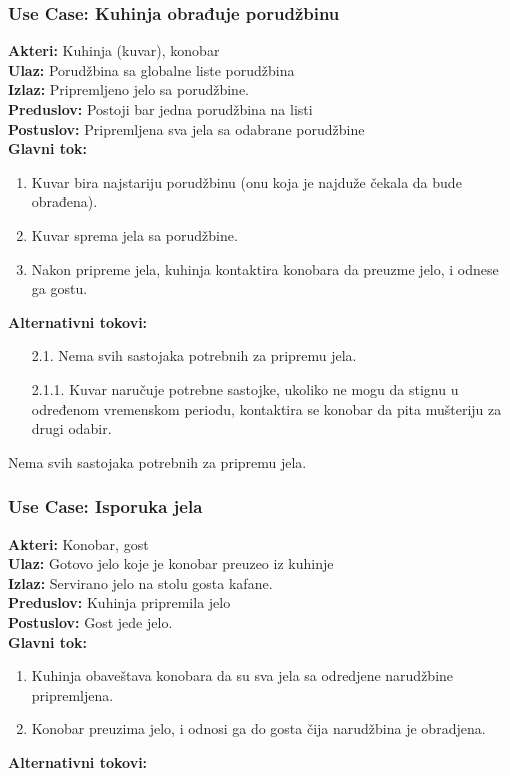 \documentclass{article}
\begin{document}
\subsubsection{\textbf{Use Case:} Kuhinja obrađuje porudžbinu}
\textbf{Akteri:} Kuhinja (kuvar), konobar\\
\textbf{Ulaz:} Porudžbina sa globalne liste porudžbina\\
\textbf{Izlaz:} Pripremljeno jelo sa porudžbine.\\
\textbf{Preduslov:} Postoji bar jedna porudžbina na listi\\
\textbf{Postuslov:} Pripremljena sva jela sa odabrane porudžbine\\
\textbf{Glavni tok:}
\begin{enumerate}
\item Kuvar bira najstariju porudžbinu (onu koja je najduže čekala da bude obrađena).
\item Kuvar sprema jela sa porudžbine.
\item Nakon pripreme jela, kuhinja kontaktira konobara da preuzme jelo, i odnese ga gostu.
\end{enumerate}
\textbf{Alternativni tokovi:}
\begin{enumerate}
\item [2.1.] Nema svih sastojaka potrebnih za pripremu jela.
\item [2.1.1.] Kuvar naručuje potrebne sastojke, ukoliko ne mogu da stignu u određenom vremenskom periodu, kontaktira se konobar da pita mušteriju za drugi odabir. 
\end{enumerate} Nema svih sastojaka potrebnih za pripremu jela.\\

 
 
\subsubsection{\textbf{Use Case:} Isporuka jela}
\textbf{Akteri:} Konobar, gost\\
 \textbf{Ulaz:} Gotovo jelo koje je konobar preuzeo iz kuhinje\\
 \textbf{Izlaz:} Servirano jelo na stolu gosta kafane.\\
 \textbf{Preduslov:} Kuhinja pripremila jelo\\
 \textbf{Postuslov:} Gost jede jelo.\\
 \textbf{Glavni tok:} 
\begin{enumerate}
\item Kuhinja obaveštava konobara da su sva jela sa odredjene narudžbine pripremljena.
\item Konobar preuzima jelo, i odnosi ga do gosta čija narudžbina je obradjena. 
\end{enumerate}
\textbf{Alternativni tokovi:} \\
\end{document}
